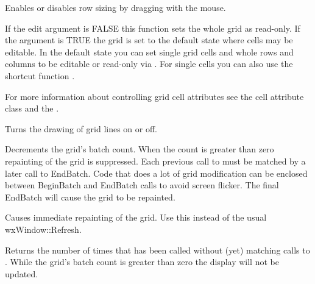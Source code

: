 Enables or disables row sizing by dragging with the mouse.

\label{wxgridenableediting}


If the edit argument is FALSE this function sets the whole grid as read-only. If the
argument is TRUE the grid is set to the default state where cells may be editable. In the
default state you can set single grid cells and whole rows and columns to be editable or
read-only via 
. For single
cells you can also use the shortcut function 
. 

For more information about controlling grid cell attributes see the 
 cell attribute class and the 
.

\label{wxgridenablegridlines}


Turns the drawing of grid lines on or off.

\label{wxgridendbatch}


Decrements the grid's batch count. When the count is greater than zero repainting of
the grid is suppressed. Each previous call to 
 must be matched by a later call to
EndBatch. Code that does a lot of grid modification can be enclosed between
BeginBatch and EndBatch calls to avoid screen flicker. The final EndBatch will
cause the grid to be repainted.

\label{wxgridforcerefresh}


Causes immediate repainting of the grid. Use this instead of the usual wxWindow::Refresh.

\label{wxgridgetbatchcount}


Returns the number of times that  has been called
without (yet) matching calls to . While
the grid's batch count is greater than zero the display will not be updated.

